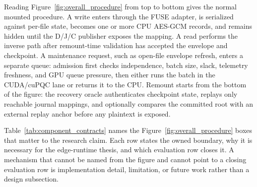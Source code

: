 Reading Figure~\ref{fig:overall_procedure} from top to bottom gives the normal mounted procedure.  A write enters through the FUSE adapter, is serialized against per-file state, becomes one or more CPU AES-GCM records, and remains hidden until the D/J/C publisher exposes the mapping.  A read performs the inverse path after remount-time validation has accepted the envelope and checkpoint.  A maintenance request, such as open-file envelope refresh, enters a separate queue: admission first checks independence, batch size, slack, telemetry freshness, and GPU queue pressure, then either runs the batch in the CUDA/cuPQC lane or returns it to the CPU.  Remount starts from the bottom of the figure: the recovery oracle authenticates checkpoint state, replays only reachable journal mappings, and optionally compares the committed root with an external replay anchor before any plaintext is exposed.

Table~\ref{tab:component_contracts} names the Figure~\ref{fig:overall_procedure} boxes that matter to the research claim.  Each row states the owned boundary, why it is necessary for the edge-runtime thesis, and which evaluation row closes it.  A mechanism that cannot be named from the figure and cannot point to a closing evaluation row is implementation detail, limitation, or future work rather than a design subsection.

